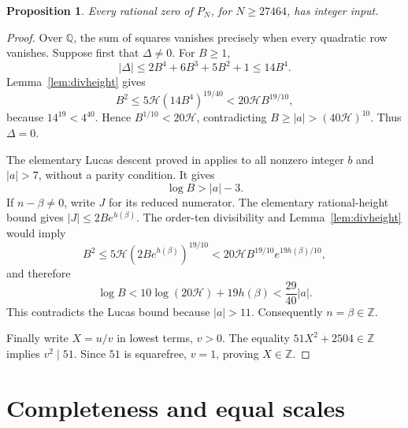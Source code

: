 \documentclass[11pt,a4paper]{article}
\newtheorem{proposition}[theorem]{Proposition}
\theoremstyle{remark}\newtheorem{remark}[theorem]{Remark}
\newcommand{\Q}{\mathbb Q}\newcommand{\Z}{\mathbb Z}
\newcommand{\HH}{\mathcal H}
\begin{document}
\begin{proposition}\label{prop:soundness}
Every rational zero of $P_N$, for $N\ge27464$, has integer input.
\end{proposition}
\begin{proof}
Over $\Q$, the sum of squares vanishes precisely when every
quadratic row vanishes. Suppose first that $\Delta\ne0$.
For $B\ge1$,
\[
 |\Delta|\le2B^4+6B^3+5B^2+1\le14B^4.
\]
Lemma~\ref{lem:divheight} gives
\[
 B^2\le5\HH(14B^4)^{19/40}<20\HH B^{19/10},
\]
because $14^{19}<4^{40}$. Hence $B^{1/10}<20\HH$,
contradicting $B\ge|a|>(40\HH)^{10}$.
Thus $\Delta=0$.

The elementary Lucas descent proved in
\cite[Section 4]{Quartic392} applies to all nonzero integer
$b$ and $|a|>7$, without a parity condition. It gives
\[
                            \log B>|a|-3.
\]
If $n-\beta\ne0$, write $J$ for its reduced numerator.
The elementary rational-height bound gives
$|J|\le2B e^{h(\beta)}$. The order-ten divisibility and
Lemma~\ref{lem:divheight} would imply
\[
 B^2\le5\HH(2B e^{h(\beta)})^{19/10}
       <20\HH B^{19/10}e^{19h(\beta)/10},
\]
and therefore
\[
 \log B<10\log(20\HH)+19h(\beta)
       <\frac{29}{40}|a|.
\]
This contradicts the Lucas bound because $|a|>11$.
Consequently $n=\beta\in\Z$.

Finally write $X=u/v$ in lowest terms, $v>0$. The equality
$51X^2+2504\in\Z$ implies $v^2\mid51$. Since $51$ is
squarefree, $v=1$, proving $X\in\Z$.
\end{proof}

\section{Completeness and equal scales}
\end{document}
